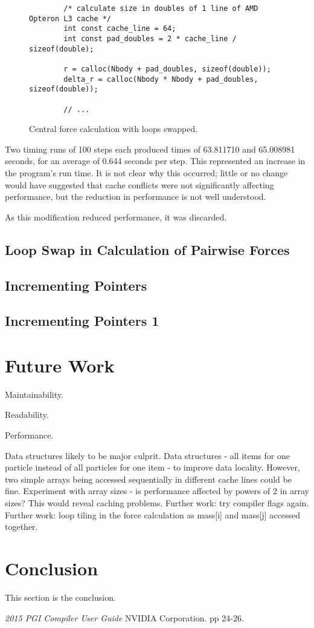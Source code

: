 \documentclass[11pt, oneside]{article}   %
\begin{document}
\begin{figure}
	\begin{lstlisting}
		/* calculate size in doubles of 1 line of AMD Opteron L3 cache */
		int const cache_line = 64;
		int const pad_doubles = 2 * cache_line / sizeof(double);

		r = calloc(Nbody + pad_doubles, sizeof(double));
		delta_r = calloc(Nbody * Nbody + pad_doubles, sizeof(double));

		// ...
	\end{lstlisting}
	\caption{Central force calculation with loops swapped.}
	\label{figure:Pad}
\end{figure}

Two timing runs of 100 steps each produced times of 63.811710 and 65.008981 seconds, for an average of 0.644 seconds per step.
This represented an increase in the program's run time.
It is not clear why this occurred; little or no change would have suggested that cache conflicts were not significantly affecting performance, but the reduction in performance is not well understood.

As this modification reduced performance, it was discarded.

\subsection{Loop Swap in Calculation of Pairwise Forces}

\subsection{Incrementing Pointers}
\subsection{Incrementing Pointers 1}

\section{Future Work}

Maintainability.

Readability.

Performance.

Data structures likely to be major culprit.
Data structures - all items for one particle instead of all particles for one item - to improve data locality.  However, two simple arrays being accessed sequentially in different cache lines could be fine.
Experiment with array sizes - is performance affected by powers of 2 in array sizes?  This would reveal caching problems.  
Further work: try compiler flags again.
Further work: loop tiling in the force calculation as mass[i] and mass[j] accessed together.


\section{Conclusion}
This section is the conclusion.

\begin{thebibliography}{100}

 {\em 2015 PGI Compiler User Guide} NVIDIA Corporation. pp 24-26.

\end{thebibliography}
\end{document}
